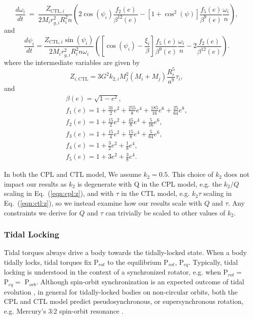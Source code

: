 \documentclass[twocolumn]{aastex61}
\begin{document}
\begin{equation}\label{eqn:ctl:omega}
  \frac{d\omega_i}{dt} \ = \ \frac{Z_{\mathrm{CTL},i}}{2 M_i r_{g,i}^2 
R_i^2 n} \left( 2 \cos(\psi_i) \frac{f_2(e)}{\beta^{12}(e)} - \left[ 1+\cos^2(\psi)
 \right] \frac{f_5(e)}{\beta^9(e)} 
\frac{\omega_i}{n} \right),  
\end{equation}
and
\begin{equation}\label{eqn:ctl:psi}
  \frac{d\psi_i}{dt} = \frac{Z_{\mathrm{CTL},i} \sin(\psi_i)}{2 M_i r_{g,i}^2 R_i^2 n \omega_i}\left( \left[ \cos(\psi_i) - \frac{\xi_i}{ \beta} \right] \frac{f_5(e)}{\beta^9(e)} \frac{\omega_i}{n} - 2 \frac{f_2(e)}{\beta^{12}(e)} \right).
\end{equation}
where the intermediate variables are given by 
\begin{equation}\label{eqn:ctl:z}
 Z_{i,\mathrm{CTL}} = 3 G^2 k_{2,i} M_j^2 (M_i+M_j) \frac{R_i^5}{a^9} \tau_i ,
\end{equation}
and 
\begin{equation}\label{eqn:ctl:f_e}
\begin{array}{l}
\beta(e) = \sqrt{1-e^2},\\
f_1(e) = 1 + \frac{31}{2} e^2 + \frac{255}{8} e^4 + \frac{185}{16} e^6 + \frac{25}{
64} e^8,\\
f_2(e) = 1 + \frac{15}{2} e^2 + \frac{45}{8} e^4 + \frac{5}{16} e^6,\\
f_3(e) = 1 + \frac{15}{4} e^2 + \frac{15}{8} e^4 + \frac{5}{64} e^6,\\
f_4(e) = 1 + \frac{3}{2} e^2 + \frac{1}{8} e^4,\\
f_5(e) = 1 + 3 e^2 + \frac{3}{8} e^4.
\end{array}
\end{equation}

In both the CPL and CTL model, We assume $k_2 = 0.5$. This choice of $k_2$ does not impact our results as $k_2$ is degenerate with Q in the CPL model, e.g. the $k_2/Q$ scaling in Eq.~(\ref{eqn:cpl:z}), and with $\tau$ in the CTL model, e.g. $k_2 \tau$ scaling in Eq.~(\ref{eqn:ctl:z}), so we instead examine how our results scale with $Q$ and $\tau$.  Any constraints we derive for $Q$ and $\tau$ can trivially be scaled to other values of $k_2$.

\subsubsection{Tidal Locking}

Tidal torques always drive a body towards the tidally-locked state. When a body tidally locks, tidal torques fix P$_{rot}$ to the equilibrium P$_{rot}$, P$_{eq}$.  Typically, tidal locking is understood in the context of a synchronized rotator, e.g. when P$_{rot} = $ P$_{eq} = $ P$_{orb}$. Although spin-orbit synchronization is an expected outcome of tidal evolution \citep{Counselman1973}, in general for tidally-locked bodies on non-circular orbits, both the CPL and CTL model predict pseudosynchronous, or supersynchronous rotation, e.g. Mercury's 3:2 spin-orbit resonance \citep[P$_{rot} = 2/3$ P$_{orb}$,][]{GoldreichPeale1966}.   
\end{document}
